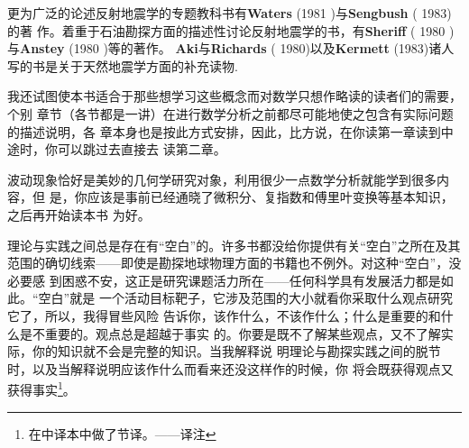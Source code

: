 更为广泛的论述反射地震学的专题教科书有\textbf{Waters} (1981
)与\textbf{Sengbush} ( 1983)的著
作。着重于石油勘探方面的描述性讨论反射地震学的书，有\textbf{Sheriff} (
1980 )与\textbf{Anstey} (1980 )等的著作。
\textbf{Aki}与\textbf{Richards} ( 1980)以及\textbf{Kermett} (1983)诸人写的书是关于天然地震学方面的补充读物.

我还试图使本书适合于那些想学习这些概念而对数学只想作略读的读者们的需要，个别
章节（各节都是一讲）在进行数学分析之前都尽可能地使之包含有实际问题的描述说明，各
章本身也是按此方式安排，因此，比方说，在你读第一章读到中途时，你可以跳过去直接去
读第二章。

波动现象恰好是美妙的几何学研究对象，利用很少一点数学分析就能学到很多内容，但
是，你应该是事前已经通晓了微积分、复指数和傅里叶变换等基本知识，之后再开始读本书
为好。

理论与实践之间总是存在有“空白”的。许多书都没给你提供有关“空白”之所在及其
范围的确切线索------即使是勘探地球物理方面的书籍也不例外。对这种“空白”，没必要感
到困惑不安，这正是研究课题活力所在------任何科学具有发展活力都是如此。“空白”就是
一个活动目标靶子，它涉及范围的大小就看你采取什么观点研究它了，所以，我得冒些风险
告诉你，该作什么，不该作什么；什么是重要的和什么是不重要的。观点总是超越于事实
的。你要是既不了解某些观点，又不了解实际，你的知识就不会是完整的知识。当我解释说
明理论与勘探实践之间的脱节时，以及当解释说明应该作什么而看来还没这样作的时候，你
将会既获得观点又获得事实\footnote{在中译本中做了节译。——译注}。




